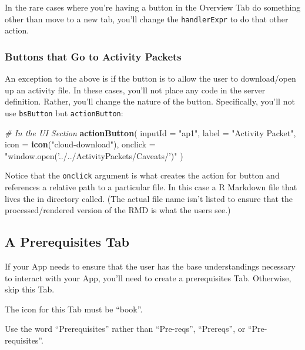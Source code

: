 \documentclass[
]{book}
\newenvironment{Shaded}{\begin{snugshade}}{\end{snugshade}}
\newcommand{\CommentTok}[1]{\textcolor[rgb]{0.56,0.35,0.01}{\textit{#1}}}
\newcommand{\DataTypeTok}[1]{\textcolor[rgb]{0.13,0.29,0.53}{#1}}
\newcommand{\KeywordTok}[1]{\textcolor[rgb]{0.13,0.29,0.53}{\textbf{#1}}}
\newcommand{\NormalTok}[1]{#1}
\newcommand{\StringTok}[1]{\textcolor[rgb]{0.31,0.60,0.02}{#1}}
\begin{document}
In the rare cases where you're having a button in the Overview Tab do something other than move to a new tab, you'll change the \texttt{handlerExpr} to do that other action.

\hypertarget{buttons-that-go-to-activity-packets-1}{%
\subsubsection{Buttons that Go to Activity Packets}\label{buttons-that-go-to-activity-packets-1}}

An exception to the above is if the button is to allow the user to download/open up an activity file. In these cases, you'll not place any code in the server definition. Rather, you'll change the nature of the button. Specifically, you'll not use \texttt{bsButton} but \texttt{actionButton}:

\begin{Shaded}
\begin{Highlighting}[]
\CommentTok{# In the UI Section}
\KeywordTok{actionButton}\NormalTok{(}
  \DataTypeTok{inputId =} \StringTok{"ap1"}\NormalTok{,}
  \DataTypeTok{label =} \StringTok{"Activity Packet"}\NormalTok{,}
  \DataTypeTok{icon =} \KeywordTok{icon}\NormalTok{(}\StringTok{"cloud-download"}\NormalTok{),}
  \DataTypeTok{onclick =} \StringTok{"window.open('../../ActivityPackets/Caveats/')"}
\NormalTok{)}
\end{Highlighting}
\end{Shaded}

Notice that the \texttt{onclick} argument is what creates the action for button and references a relative path to a particular file. In this case a R Markdown file that lives the in directory called. (The actual file name isn't listed to ensure that the processed/rendered version of the RMD is what the users see.)

\hypertarget{a-prerequisites-tab-1}{%
\subsection{A Prerequisites Tab}\label{a-prerequisites-tab-1}}

If your App needs to ensure that the user has the base understandings necessary to interact with your App, you'll need to create a prerequisites Tab. Otherwise, skip this Tab.

The icon for this Tab must be ``book''.

Use the word ``Prerequisites'' rather than ``Pre-reqs'', ``Prereqs'', or ``Pre-requisites''.
\end{document}
